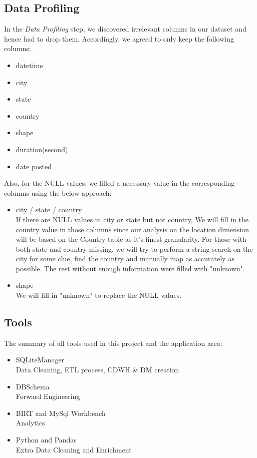 \documentclass[11pt, journal]{IEEEtran}
\begin{document}
\subsection{Data Profiling}\label{subsec:dataProfiling}
In the \emph{Data Profiling} step, we discovered irrelevant columns in our dataset and hence had to drop them.  Accordingly, we agreed to only keep the following columns:
\begin{itemize}
    \item datetime
    \item city
    \item state
    \item country
    \item shape
    \item duration(second)
    \item date posted
\end{itemize}
Also, for the NULL values, we filled a necessary value in the corresponding columns using the below approach:
\begin{itemize}
    \item city / state / country\\
    If there are NULL values in city or state but not country, We will fill in the country value in those columns since our analysis on the location dimension will be based on the Country table as it's finest granularity. For those with both state and country missing, we will try to perform a string search on the city for some clue, find the country and manually map as accurately as possible. The rest without enough information were filled with "unknown".
    \item shape\\
    We will fill in "unknown" to replace the NULL values.
\end{itemize}

\subsection{Tools}\label{subsec:tools}
The summary of all tools used in this project and the application area:  
\begin{itemize}
    \item SQLiteManager\\
    Data Cleaning, ETL process, CDWH \& DM creation
    \item DBSchema\\
    Forward Engineering
    \item BIRT and MySql Workbench\\
    Analytics
    \item Python and Pandas\\
    Extra Data Cleaning and Enrichment
\end{itemize}
    
\end{document}
